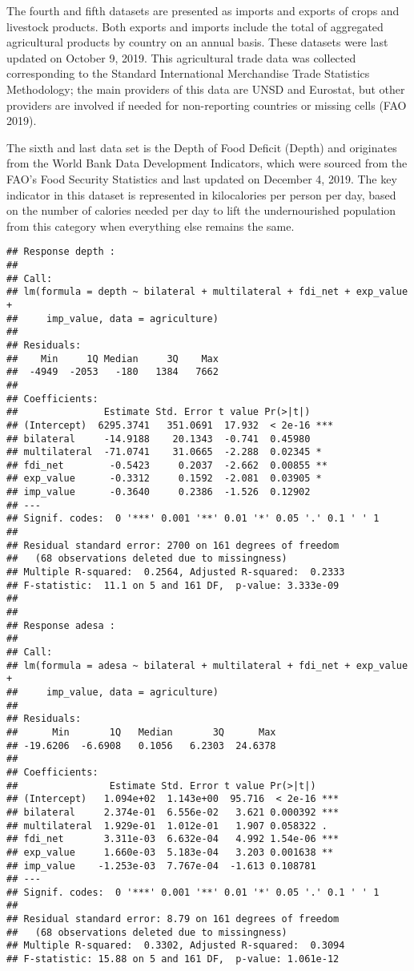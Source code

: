 \documentclass[
]{article}
\begin{document}
The fourth and fifth datasets are presented as imports and exports of
crops and livestock products. Both exports and imports include the total
of aggregated agricultural products by country on an annual basis. These
datasets were last updated on October 9, 2019. This agricultural trade
data was collected corresponding to the Standard International
Merchandise Trade Statistics Methodology; the main providers of this
data are UNSD and Eurostat, but other providers are involved if needed
for non-reporting countries or missing cells (FAO 2019).

The sixth and last data set is the Depth of Food Deficit (Depth) and
originates from the World Bank Data Development Indicators, which were
sourced from the FAO's Food Security Statistics and last updated on
December 4, 2019. The key indicator in this dataset is represented in
kilocalories per person per day, based on the number of calories needed
per day to lift the undernourished population from this category when
everything else remains the same.

\begin{verbatim}
## Response depth :
## 
## Call:
## lm(formula = depth ~ bilateral + multilateral + fdi_net + exp_value + 
##     imp_value, data = agriculture)
## 
## Residuals:
##    Min     1Q Median     3Q    Max 
##  -4949  -2053   -180   1384   7662 
## 
## Coefficients:
##               Estimate Std. Error t value Pr(>|t|)    
## (Intercept)  6295.3741   351.0691  17.932  < 2e-16 ***
## bilateral     -14.9188    20.1343  -0.741  0.45980    
## multilateral  -71.0741    31.0665  -2.288  0.02345 *  
## fdi_net        -0.5423     0.2037  -2.662  0.00855 ** 
## exp_value      -0.3312     0.1592  -2.081  0.03905 *  
## imp_value      -0.3640     0.2386  -1.526  0.12902    
## ---
## Signif. codes:  0 '***' 0.001 '**' 0.01 '*' 0.05 '.' 0.1 ' ' 1
## 
## Residual standard error: 2700 on 161 degrees of freedom
##   (68 observations deleted due to missingness)
## Multiple R-squared:  0.2564, Adjusted R-squared:  0.2333 
## F-statistic:  11.1 on 5 and 161 DF,  p-value: 3.333e-09
## 
## 
## Response adesa :
## 
## Call:
## lm(formula = adesa ~ bilateral + multilateral + fdi_net + exp_value + 
##     imp_value, data = agriculture)
## 
## Residuals:
##      Min       1Q   Median       3Q      Max 
## -19.6206  -6.6908   0.1056   6.2303  24.6378 
## 
## Coefficients:
##                Estimate Std. Error t value Pr(>|t|)    
## (Intercept)   1.094e+02  1.143e+00  95.716  < 2e-16 ***
## bilateral     2.374e-01  6.556e-02   3.621 0.000392 ***
## multilateral  1.929e-01  1.012e-01   1.907 0.058322 .  
## fdi_net       3.311e-03  6.632e-04   4.992 1.54e-06 ***
## exp_value     1.660e-03  5.183e-04   3.203 0.001638 ** 
## imp_value    -1.253e-03  7.767e-04  -1.613 0.108781    
## ---
## Signif. codes:  0 '***' 0.001 '**' 0.01 '*' 0.05 '.' 0.1 ' ' 1
## 
## Residual standard error: 8.79 on 161 degrees of freedom
##   (68 observations deleted due to missingness)
## Multiple R-squared:  0.3302, Adjusted R-squared:  0.3094 
## F-statistic: 15.88 on 5 and 161 DF,  p-value: 1.061e-12
\end{verbatim}
\end{document}
